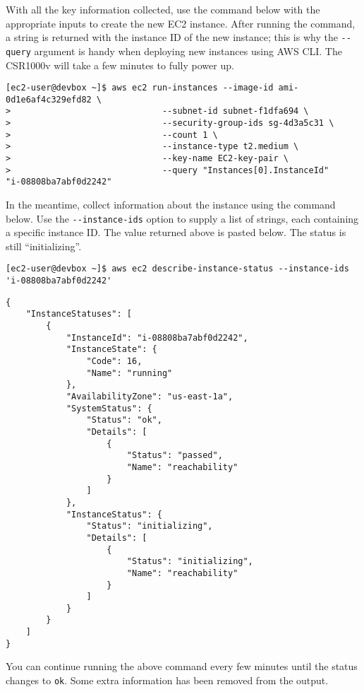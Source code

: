With all the key information collected, use the command below with the
appropriate inputs to create the new EC2 instance. After running the command,
a string is returned with the instance ID of the new instance; this is why the
\verb|--query| argument is handy when deploying new instances using AWS CLI\@. The
CSR1000v will take a few minutes to fully power up.

\begin{verbatim}
[ec2-user@devbox ~]$ aws ec2 run-instances --image-id ami-0d1e6af4c329efd82 \
>                              --subnet-id subnet-f1dfa694 \
>                              --security-group-ids sg-4d3a5c31 \
>                              --count 1 \
>                              --instance-type t2.medium \
>                              --key-name EC2-key-pair \
>                              --query "Instances[0].InstanceId"
"i-08808ba7abf0d2242"
\end{verbatim}

In the meantime, collect information about the instance using the command
below. Use the \verb|--instance-ids| option to supply a list of strings, each
containing a specific instance ID\@. The value returned above is pasted below.
The status is still ``initializing''.

\begin{verbatim}
[ec2-user@devbox ~]$ aws ec2 describe-instance-status --instance-ids 'i-08808ba7abf0d2242'
\end{verbatim}

\begin{verbatim}
{
    "InstanceStatuses": [
        {
            "InstanceId": "i-08808ba7abf0d2242", 
            "InstanceState": {
                "Code": 16, 
                "Name": "running"
            }, 
            "AvailabilityZone": "us-east-1a", 
            "SystemStatus": {
                "Status": "ok", 
                "Details": [
                    {
                        "Status": "passed", 
                        "Name": "reachability"
                    }
                ]
            }, 
            "InstanceStatus": {
                "Status": "initializing", 
                "Details": [
                    {
                        "Status": "initializing", 
                        "Name": "reachability"
                    }
                ]
            }
        }
    ]
}
\end{verbatim}

You can continue running the above command every few minutes until the status
changes to \verb|ok|. Some extra information has been removed from the output.

